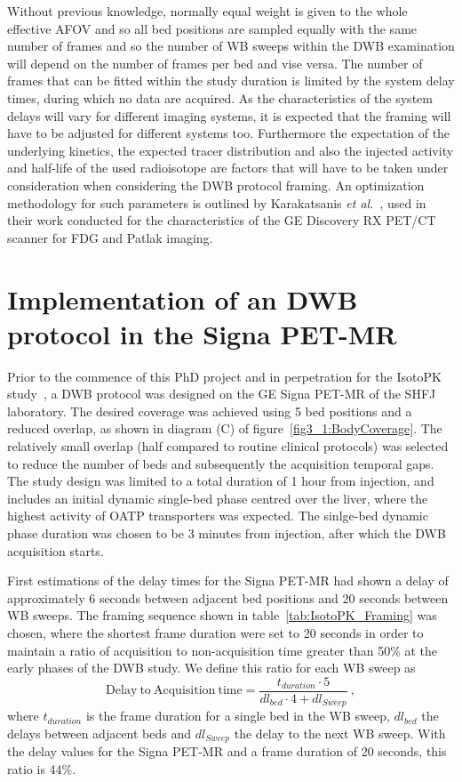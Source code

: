Without previous knowledge, normally equal weight is given to the whole effective AFOV and so all bed positions are sampled equally with the same number of frames and so the number of WB sweeps within the DWB examination will depend on the number of frames per bed and vise versa. The number of frames that can be fitted within the study duration is limited by the system delay times, during which no data are acquired. As the characteristics of the system delays will vary for different imaging systems, it is expected that the framing will have to be adjusted for different systems too. Furthermore the expectation of the underlying kinetics, the expected tracer distribution and also the injected activity and half-life of the used radioisotope are factors that will have to be taken under consideration when considering the DWB protocol framing. 
An optimization methodology for such parameters is outlined by Karakatsanis \textit{et al.}~\cite{Karakatsanis2013}, used in their work conducted for the characteristics of the GE Discovery RX PET/CT scanner for FDG and Patlak imaging. 

\section{Implementation of an DWB protocol in the Signa PET-MR}
Prior to the commence of this PhD project and in perpetration for the IsotoPK study~\cite{Marie2019}, a DWB protocol was designed on the GE Signa PET-MR of the SHFJ laboratory. The desired coverage was achieved using 5 bed positions and a reduced overlap, as shown in diagram (C) of figure~\ref{fig3_1:BodyCoverage}. The relatively small overlap (half compared to routine clinical protocols) was selected to reduce the number of beds and subsequently the acquisition temporal gaps. The study design was limited to a total duration of 1 hour from injection, and includes an initial dynamic single-bed phase centred over the liver, where the highest activity of OATP transporters was expected. The sinlge-bed dynamic phase duration was chosen to be 3 minutes from injection, after which the DWB acquisition starts.

First estimations of the delay times for the Signa PET-MR had shown a delay of approximately 6 seconds between adjacent bed positions and 20 seconds between WB sweeps. The framing sequence shown in table~\ref{tab:IsotoPK_Framing} was chosen, where the shortest frame duration were set to 20 seconds in order to maintain a ratio of acquisition to non-acquisition time greater than 50\% at the early phases of the DWB study. We define this ratio for each WB sweep as
%
\begin{equation} \label{acq_to_dead_time}
 \mathrm{Delay\ to\ Acquisition\ time} = \frac{t_{duration}\cdot 5 }{dl_{bed}\cdot 4 + dl_{Sweep}}  \ ,
\end{equation}
%
where $t_{duration}$ is the frame duration for a single bed in the WB sweep, $dl_{bed}$ the delays between adjacent beds and $dl_{Sweep}$ the delay to the next WB sweep. With the delay values for the Signa PET-MR and a frame duration of 20 seconds, this ratio is 44\%. 

